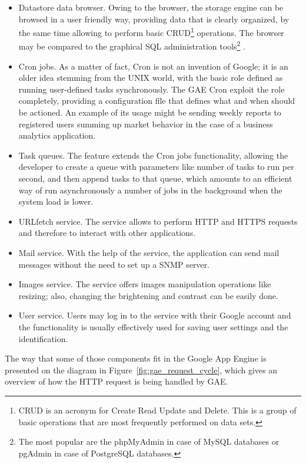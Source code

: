\begin{itemize}
\item{Datastore data browser. Owing to the browser, the storage engine can be browsed in a user friendly way, providing data that is clearly organized, by the same time allowing to perform basic CRUD\footnote{CRUD is an acronym for Create Read Update and Delete. This is a group of basic operations that are most frequently performed on data sets.} operations. The browser may be compared to the graphical SQL administration tools\footnote{The most popular are the phpMyAdmin in case of MySQL databases or pgAdmin in case of PostgreSQL databases.} .}
\item{Cron jobs.} As a matter of fact, Cron is not an invention of Google; it is an older idea stemming from the UNIX world, with the basic role defined as running user-defined tasks synchronously. The GAE Cron exploit the role completely, providing a configuration file that defines what and when should be actioned. An example of its usage might be sending weekly reports to registered users summing up market behavior in the case of a business analytics application.     
\item{Task queues.} The feature extends the Cron jobs functionality, allowing the developer to create a queue with parameters like number of tasks to run per second, and then append tasks to that queue, which amounts to an efficient way of run asynchronously a number of jobs in the background when the system load is lower.  
\item{URLfetch service. The service allows to perform HTTP and HTTPS requests and therefore to interact with other applications.}
\item{Mail service. With the help of the service, the application can send mail messages without the need to set up a SNMP server.}
\item{Images service. The service offers images manipulation operations like resizing; also, changing the brightening and contrast can be easily done.    }
\item{User service. Users may log in to the service with their Google account and the functionality is usually effectively used for saving user settings and the identification.} 
\end{itemize}
The way that some of those components fit in the Google App Engine is presented on the diagram in Figure~\ref{fig:gae_request_cycle}, which gives an overview of how the HTTP request is being handled by GAE. 
